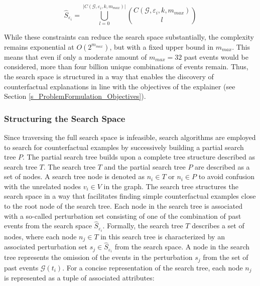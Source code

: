 \begin{equation}
    \hat{S}_{\varepsilon_i} = \bigcup_{l = 0}^{|C(\mathcal{G}, \varepsilon_i, k, m_{max})|} {C(\mathcal{G}, \varepsilon_i, k, m_{max}) \choose l}
\end{equation}

While these constraints can reduce the search space substantially, the complexity remains exponential at $O(2^{m_{max}})$, but with a fixed upper bound in $m_{max}$. This means that even if only a moderate amount of $m_{max} = 32$ past events would be considered, more than four billion unique combinations of events remain. Thus, the search space is structured in a way that enables the discovery of counterfactual explanations in line with the objectives of the explainer (see Section \ref{s_ProblemFormulation_Objectives}).


\subsubsection{Structuring the Search Space}
\label{s_Methodology_SearchSpace_Structure}

Since traversing the full search space is infeasible, search algorithms are employed to search for counterfactual examples by successively building a partial search tree $P$. The partial search tree builds upon a complete tree structure described as search tree $T$. The search tree $T$ and the partial search tree $P$ are described as a set of nodes. A search tree node is denoted as $n_i \in T$ or $n_i \in P$ to avoid confusion with the unrelated nodes $v_i \in V$ in the graph. The search tree structures the search space in a way that facilitates finding simple counterfactual examples close to the root node of the search tree. Each node in the search tree is associated with a so-called perturbation set consisting of one of the combination of past events from the search space $\hat{S}_{\varepsilon_i}$. Formally, the search tree $T$ describes a set of nodes, where each node $n_j \in T$ in this search tree is characterized by an associated perturbation set $s_j \in \hat{S}_{\varepsilon_i}$ from the search space. A node in the search tree represents the omission of the events in the perturbation $s_j$ from the set of past events $\mathcal{G}(t_i)$. For a concise representation of the search tree, each node $n_j$ is represented as a tuple of associated attributes:

